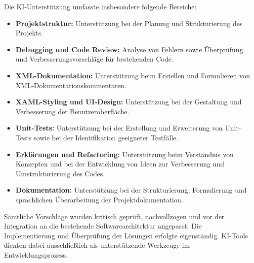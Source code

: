 \documentclass[12pt,a4paper]{article}
\begin{document}
Die KI-Unterstützung umfasste insbesondere folgende Bereiche:

\begin{itemize}
  \item \textbf{Projektstruktur:} Unterstützung bei der Planung und
    Strukturierung des Projekts.
  \item \textbf{Debugging und Code Review:} Analyse von Fehlern sowie
    Überprüfung und Verbesserungsvorschläge für bestehenden Code.
  \item \textbf{XML-Dokumentation:} Unterstützung beim Erstellen und
    Formulieren von
    XML-Dokumentationskommentaren.
  \item \textbf{XAML-Styling und UI-Design:} Unterstützung bei der
    Gestaltung und Verbesserung der Benutzeroberfläche.
  \item \textbf{Unit-Tests:} Unterstützung bei der Erstellung und
    Erweiterung von Unit-Tests sowie bei der Identifikation geeigneter
    Testfälle.
  \item \textbf{Erklärungen und Refactoring:} Unterstützung beim
    Verständnis von Konzepten und bei der Entwicklung von Ideen zur
    Verbesserung und Umstrukturierung des Codes.
  \item \textbf{Dokumentation:} Unterstützung bei der Strukturierung,
    Formulierung und sprachlichen Überarbeitung der Projektdokumentation.
\end{itemize}

Sämtliche Vorschläge wurden kritisch geprüft, nachvollzogen und vor der
Integration an die bestehende Softwarearchitektur angepasst. Die
Implementierung und Überprüfung der Lösungen erfolgte eigenständig.
KI-Tools dienten dabei ausschließlich als unterstützende Werkzeuge im
Entwicklungsprozess.
\end{document}
